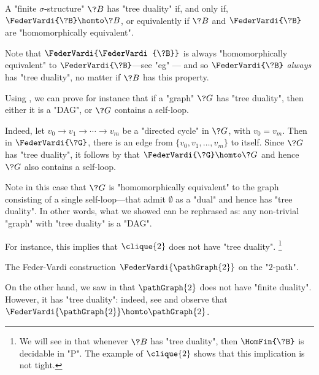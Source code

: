 \begin{proposition}
	\label{prop:charac-Feder-Vardi}
	A "finite $\sigma$-structure" $\?B$ has "tree duality" if, and only if,
	$\FederVardi{\?B} \homto \?B$, or equivalently if $\?B$ and $\FederVardi{\?B}$
	are "homomorphically equivalent".
\end{proposition}

Note that $\FederVardi{\FederVardi{\?B}}$ is always "homomorphically equivalent" to
$\FederVardi{\?B}$---see "eg" \cite[\S~9.2.2, Proposition 9.1]{NesetrilPOM2012FirstOrderCSPs}---
and so $\FederVardi{\?B}$ \emph{always} has "tree duality", no matter if $\?B$ has this property.

\begin{example}
	\label{ex:Feder-Vardi-P2}
	Using , we can prove for instance that
	if a "graph" $\?G$ has "tree duality", then either it is a "DAG", or $\?G$ contains
	a self-loop.

	Indeed, let $v_0 \to v_1 \to \cdots \to v_m$ be a "directed cycle" in $\?G$,
	with $v_0 = v_m$. Then in $\FederVardi{\?G}$, there is an edge from
	$\{v_0,v_1,\hdots,v_m\}$ to itself.
	Since $\?G$ has "tree duality", it follows by 
	that $\FederVardi{\?G} \homto \?G$ and hence $\?G$ also contains a self-loop.
	
	Note in this case that $\?G$ is "homomorphically equivalent" to the graph consisting
	of a single self-loop---that admit $\emptyset$ as a "dual" and hence has
	"tree duality". In other words, what we showed can be rephrased as: any
	non-trivial "graph" with "tree duality" is a "DAG".

	For instance, this implies that $\clique{2}$ does not have
	"tree duality".%
	\footnote{We will see in 
	that whenever $\?B$ has "tree duality", then $\HomFin{\?B}$ is decidable in "P".
	The example of $\clique{2}$ shows that this implication is not tight.}
	
	\begin{marginfigure}
		\centering
		\begin{tikzpicture}
			
		\end{tikzpicture}
		\caption{
			\AP\label{fig:P2-Feder-Vardi}
			The Feder-Vardi construction $\FederVardi{\pathGraph{2}}$
			on the "$2$-path".
		}
	\end{marginfigure}
	On the other hand, we saw in  that $\pathGraph{2}$ does not have
	"finite duality". However, it has "tree duality": indeed, see 
	and observe that $\FederVardi{\pathGraph{2}} \homto \pathGraph{2}$.
\end{example}